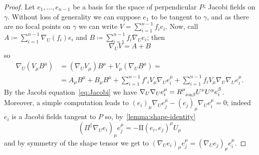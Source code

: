 \begin{proof}
	Let \(e_1, \ldots, e_{n - 1}\) be a basis for the space of perpendicular \(P\)- Jacobi fields on \(\gamma\). Without loss of generality we can suppose \(e_1\) to be tangent to \(\gamma\), and as there are no focal points on \(\gamma\) we can write \(V = \sum_{i = 1}^{n - 1} f_ie_i\).
	Now, call \(A \coloneqq \sum_{i = 1}^{n - 1} \nabla_U(f_i)e_i\) and \(B \coloneqq \sum_{i = 1}^{n - 1} f_i\nabla_Ue_i\); then
	\[
	\nabla_UV = A + B
	\]
	so
	\begin{align*}
		\nabla_U(V_{\mu}B^{\mu}) &= (\nabla_UV_{\mu})B^{\mu} + V_{\mu}(\nabla_UB^{\mu}) = \\
		 &= A_{\mu}B^{\mu} + B_{\mu}B^{\mu} + \sum_{i = 1}^{n - 1}f'_iV_{\mu}\nabla_Ue_i^{\mu} + \sum_{i = 1}^{n - 1}f_iV_{\mu}\nabla_U\nabla_Ue_i^{\mu}.
	\end{align*}
	By the Jacobi equation~\eqref{eq:Jacobi} we have \(\nabla_U\nabla_Ue_i^{\mu} = R\indices{^{\mu}_{\nu\alpha\beta}}U^{\nu}U^{\alpha}e_i^{\beta}\). Moreover, a simple computation leads to \((e_i)_{\mu}\nabla_Ue_j^{\mu} - (e_j)_{\mu}\nabla_Ue_i^{\mu} = 0\); indeed \(e_i\) is  a Jacobi fields tangent to \(P\) so, by~\ref{lemma:shape-identity}
	\[
	(\Pi^{\parallel}\nabla_Ue_i)_{\mu}e_j^{\mu} = - \mathrm{I\!I}(e_i, e_j)^{\mu}U_{\mu}
	\]
	and by symmetry of the shape tensor we get to \((\nabla_Ue_i)_{\mu}e_j^{\mu} = (\nabla_Ue_j)_{\mu}e_i^{\mu}\). 


\end{proof}
